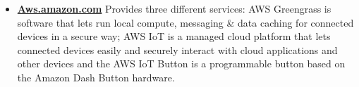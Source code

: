 \begin{itemize}
	\item \href{https://aws.amazon.com/es/iot/?sc_channel=PS&sc_campaign=acquisition_ES&sc_publisher=google&sc_medium=english_iot_nb&sc_content=iot_p&sc_detail=iot&sc_category=iot&sc_segment=153188699025&sc_matchtype=p&sc_country=ES&s_kwcid=AL!4422!3!153188699025!p!!g!!iot&ef_id=V1R0KQAABC@8IbS5:20170506155609:s}{\textbf{Aws.amazon.com}}
	Provides three different services: AWS Greengrass is software that lets run local compute, messaging \& data caching for connected devices in a secure way; AWS IoT is a managed cloud platform that lets connected devices easily and securely interact with cloud applications and other devices and the AWS IoT Button is a programmable button based on the Amazon Dash Button hardware. 
\end{itemize}